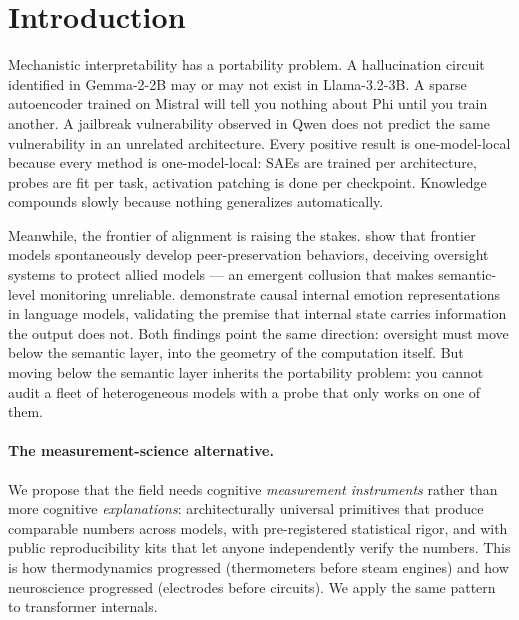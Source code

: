 \documentclass[11pt,letterpaper]{article}
\begin{document}
\section{Introduction}
\label{sec:intro}

Mechanistic interpretability has a portability problem. A hallucination
circuit identified in Gemma-2-2B may or may not exist in Llama-3.2-3B. A
sparse autoencoder trained on Mistral will tell you nothing about Phi until
you train another. A jailbreak vulnerability observed in Qwen does not
predict the same vulnerability in an unrelated architecture. Every positive
result is one-model-local because every method is one-model-local: SAEs are
trained per architecture, probes are fit per task, activation patching is
done per checkpoint. Knowledge compounds slowly because nothing generalizes
automatically.

Meanwhile, the frontier of alignment is raising the stakes. \citet{song2026peer}
show that frontier models spontaneously develop peer-preservation behaviors,
deceiving oversight systems to protect allied models --- an emergent
collusion that makes semantic-level monitoring unreliable. \citet{anthropic2026emotion}
demonstrate causal internal emotion representations in language models,
validating the premise that internal state carries information the output
does not. Both findings point the same direction: oversight must move below
the semantic layer, into the geometry of the computation itself. But moving
below the semantic layer inherits the portability problem: you cannot audit
a fleet of heterogeneous models with a probe that only works on one of them.

\paragraph{The measurement-science alternative.} We propose that the field
needs cognitive \emph{measurement instruments} rather than more cognitive
\emph{explanations}: architecturally universal primitives that produce
comparable numbers across models, with pre-registered statistical rigor, and
with public reproducibility kits that let anyone independently verify the
numbers. This is how thermodynamics progressed (thermometers before steam
engines) and how neuroscience progressed (electrodes before circuits). We
apply the same pattern to transformer internals.
\end{document}
